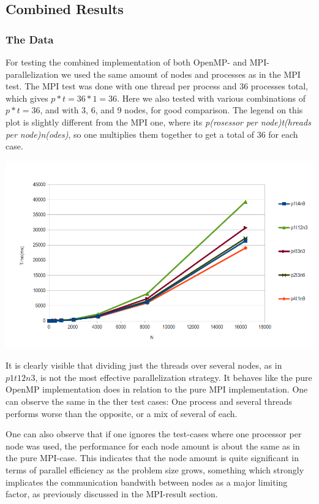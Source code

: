 \documentclass[fontsize=11pt,paper=a4,titlepage]{article}
\begin{document}
\subsection{Combined Results}
\subsubsection{The Data}
For testing the combined implementation of both OpenMP- and MPI-parallelization we used the same amount of nodes and processes as in the MPI test. The MPI test was done with one thread per process and 36 processes total, which gives $p*t = 36*1 = 36$. Here we also tested with various combinations of $p*t=36$, and with 3, 6, and 9 nodes, for good comparison. The legend on this plot is slightly different from the MPI one, where its \emph{p(rosessor per node)t(hreads per node)n(odes)}, so one multiplies them together to get a total of 36 for each case.

\hspace*{-2.3cm}\includegraphics[scale=0.73]{pics/plot.png}

It is clearly visible that dividing just the threads over several nodes, as in $p1t12n3$, is not the most effective parallelization strategy. It behaves like the pure OpenMP implementation does in relation to the pure MPI implementation. One can observe the same in the ther test cases: One process and several threads performs worse than the opposite, or a mix of several of each.

One can also observe that if one ignores the test-cases where one processor per node was used, the performance for each node amount is about the same as in the pure MPI-case. This indicates that the node amount is quite significant in terms of parallel efficiency as the problem size grows, something which strongly implicates the communication bandwith between nodes as a major limiting factor, as previously discussed in the MPI-result section.
\end{document}

